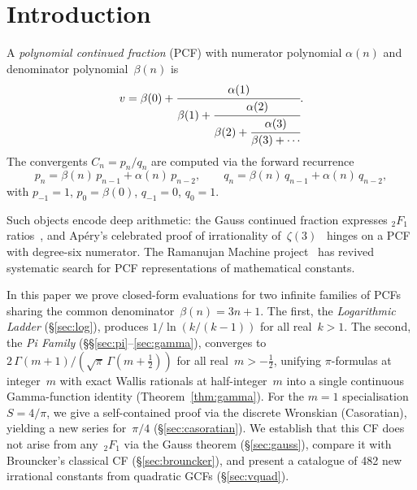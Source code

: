 \documentclass[11pt,a4paper]{article}
\theoremstyle{plain}
\theoremstyle{definition}
\theoremstyle{remark}
\newcommand{\half}{\tfrac{1}{2}}
\begin{document}
\tableofcontents

\section{Introduction}\label{sec:intro}

A \emph{polynomial continued fraction} (PCF) with numerator polynomial
$\alpha(n)$ and denominator polynomial~$\beta(n)$ is
\begin{equation}\label{eq:pcf}
  v = \beta(0) + \cfrac{\alpha(1)}{\beta(1) +
  \cfrac{\alpha(2)}{\beta(2) + \cfrac{\alpha(3)}{\beta(3) + \cdots}}}.
\end{equation}
The convergents $C_n = p_n/q_n$ are computed via the forward recurrence
\begin{equation}\label{eq:rec}
  p_n = \beta(n)\,p_{n-1} + \alpha(n)\,p_{n-2}, \qquad
  q_n = \beta(n)\,q_{n-1} + \alpha(n)\,q_{n-2},
\end{equation}
with $p_{-1} = 1$, $p_0 = \beta(0)$, $q_{-1} = 0$, $q_0 = 1$.

Such objects encode deep arithmetic: the Gauss continued fraction
expresses ${}_2F_1$ ratios~\cite{wall1948,lorentzen2008}, and Ap\'ery's
celebrated proof of irrationality of~$\zeta(3)$~\cite{apery1979} hinges
on a PCF with degree-six numerator.
The Ramanujan Machine project~\cite{raayoni2021,elimelech2024} has revived
systematic search for PCF representations of mathematical constants.

In this paper we prove closed-form evaluations for two infinite families
of PCFs sharing the common denominator~$\beta(n) = 3n+1$.
The first, the \emph{Logarithmic Ladder} (\S\ref{sec:log}), produces
$1/\ln(k/(k{-}1))$ for all real~$k > 1$.
The second, the \emph{Pi Family} (\S\S\ref{sec:pi}--\ref{sec:gamma}),
converges to~$2\,\Gamma(m{+}1)/(\sqrt{\pi}\,\Gamma(m{+}\half))$
for all real~$m > -\frac{1}{2}$, unifying $\pi$-formulas at integer~$m$
with exact Wallis rationals at half-integer~$m$ into a single continuous
Gamma-function identity (Theorem~\ref{thm:gamma}).
For the $m=1$ specialisation~$S = 4/\pi$, we give a self-contained proof
via the discrete Wronskian (Casoratian), yielding a new series for~$\pi/4$
(\S\ref{sec:casoratian}).
We establish that this CF does not arise from any~${}_2F_1$ via the Gauss
theorem (\S\ref{sec:gauss}), compare it with Brouncker's classical CF
(\S\ref{sec:brouncker}), and present a catalogue of 482 new irrational
constants from quadratic GCFs (\S\ref{sec:vquad}).
\end{document}
